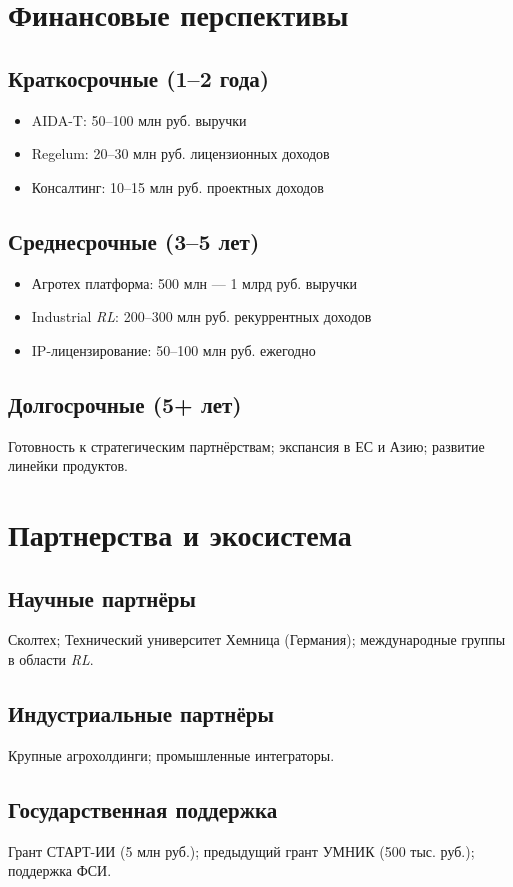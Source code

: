 \documentclass[12pt,a4paper]{article}
\begin{document}
\section{Финансовые перспективы}
\subsection*{Краткосрочные (1–2 года)}
\begin{itemize}
    \item AIDA-T: 50–100 млн руб. выручки
    \item Regelum: 20–30 млн руб. лицензионных доходов
    \item Консалтинг: 10–15 млн руб. проектных доходов
\end{itemize}
\subsection*{Среднесрочные (3–5 лет)}
\begin{itemize}
    \item Агротех платформа: 500 млн --- 1 млрд руб. выручки
    \item Industrial \textit{RL}: 200–300 млн руб. рекуррентных доходов
    \item IP-лицензирование: 50–100 млн руб. ежегодно
\end{itemize}
\subsection*{Долгосрочные (5+ лет)}
Готовность к стратегическим партнёрствам; экспансия в ЕС и Азию; развитие линейки продуктов.

\section{Партнерства и экосистема}
\subsection*{Научные партнёры}
Сколтех; Технический университет Хемница (Германия); международные группы в области \textit{RL}.

\subsection*{Индустриальные партнёры}
Крупные агрохолдинги; промышленные интеграторы.

\subsection*{Государственная поддержка}
Грант СТАРТ-ИИ (5 млн руб.); предыдущий грант УМНИК (500 тыс. руб.); поддержка ФСИ.
\end{document}
